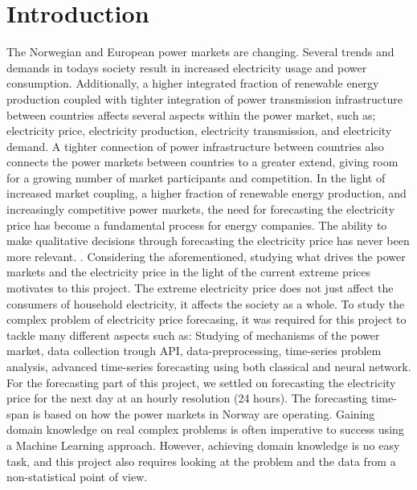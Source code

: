 \documentclass
[twocolumn,
secnumarabic,
nobibnotes,
aps,
prl,
reprint,
groupedaddress,
amsmath,
amssymb,
]{revtex4-2}
\begin{document}
\section{Introduction}
The Norwegian and European power markets are changing. Several trends and demands in todays society result in increased electricity usage and power consumption. Additionally, a higher integrated fraction of renewable energy production coupled with tighter integration of power transmission infrastructure between countries affects several aspects within the power market, such as; electricity price, electricity production, electricity transmission, and electricity demand. A tighter connection of power infrastructure between countries also connects the power markets between countries to a greater extend, giving room for a growing number of market participants and competition. In the light of increased market coupling, a higher fraction of renewable energy production, and increasingly competitive power markets, the need for forecasting the electricity price has become a fundamental process for energy companies. The ability to make qualitative decisions through forecasting the electricity price has never been more relevant. \cite{nowotarski_recent_2018}. Considering the aforementioned, studying what drives the power markets and the electricity price in the light of the current extreme prices motivates to this project. The extreme electricity price does not just affect the consumers of household electricity, it affects the society as a whole. To study the complex problem of electricity price forecasing, it was required for this project to tackle many different aspects such as: Studying of mechanisms of the power market, data collection trough API, data-preprocessing, time-series problem analysis, advanced time-series forecasting using both classical and neural network. For the forecasting part of this project, we settled on forecasting the electricity price for the next day at an hourly resolution (24 hours). The forecasting time-span is based on how the power markets in Norway are operating. Gaining domain knowledge on real complex problems is often imperative to success using a Machine Learning approach. However, achieving domain knowledge is no easy task, and this project also requires looking at the problem and the data from a non-statistical point of view.
\\\\
\end{document}

